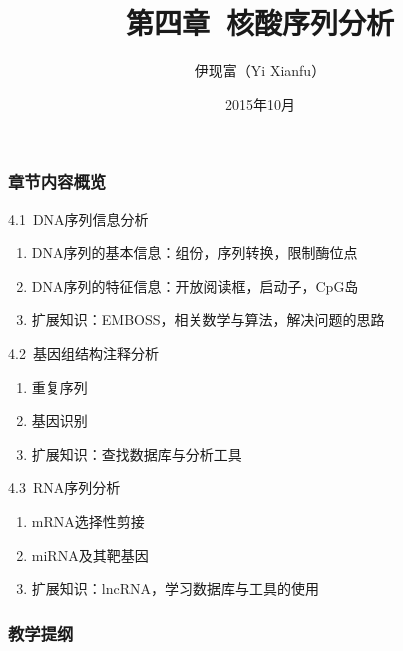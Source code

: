 




\title[核酸序列分析]{第四章\ 核酸序列分析}
\author[Yixf]{伊现富（Yi Xianfu）}
\date{2015年10月}

\begin{frame}
  \titlepage
\end{frame}

\begin{frame}
  \frametitle{章节内容概览}
  \begin{block}{4.1\ DNA序列信息分析}
    \begin{enumerate}
      \item DNA序列的基本信息：组份，序列转换，限制酶位点
      \item DNA序列的特征信息：开放阅读框，启动子，CpG岛
      \item 扩展知识：EMBOSS，相关数学与算法，解决问题的思路
    \end{enumerate}
  \end{block}
  \vspace{-0.2cm}
  \begin{block}{4.2\ 基因组结构注释分析}
    \begin{enumerate}
      \item 重复序列
      \item 基因识别
      \item 扩展知识：查找数据库与分析工具
    \end{enumerate}
  \end{block}
  \vspace{-0.2cm}
  \begin{block}{4.3\ RNA序列分析}
    \begin{enumerate}
      \item mRNA选择性剪接
      \item miRNA及其靶基因
      \item 扩展知识：lncRNA，学习数据库与工具的使用
    \end{enumerate}
  \end{block}
\end{frame}

\begin{frame}[plain]
  \frametitle{教学提纲}
  \setcounter{tocdepth}{2}
  \begin{multicols}{2}
  \tableofcontents
  \end{multicols}
\end{frame}








